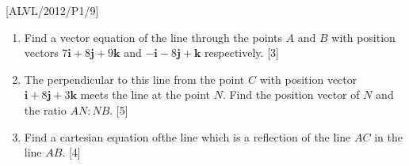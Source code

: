 \item {[}ALVL/2012/P1/9{]}
\begin{enumerate}
\item Find a vector equation of the line through the points $A$ and $B$
with position vectors $7\mathbf{i}+8\mathbf{j}+9\mathbf{k}$ and $-\mathbf{i}-8\mathbf{j}+\mathbf{k}$
respectively. \hfill{}{[}3{]}
\item The perpendicular to this line from the point $C$ with position vector
$\mathbf{i}+8\mathbf{j}+3\mathbf{k}$ meets the line at the point
$N$. Find the position vector of $N$ and the ratio $AN:NB$. \hfill{}{[}5{]}
\item Find a cartesian equation ofthe line which is a reflection of the
line $AC$ in the line $AB$. \hfill{}{[}4{]}
\end{enumerate}
